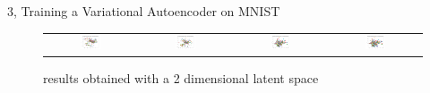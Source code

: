 \documentclass[10pt,a4paper]{article}
\begin{document}
\begin{task}{3, Training a Variational Autoencoder on MNIST}
\begin{enumerate}
\begin{figure}[H]
\caption{results obtained with a 2 dimensional latent space}
\label{fig:latent-2} 
\begin{tabular}{cccc}
  \includegraphics[width=0.23\textwidth]{../plots/task3/latent_epoch1_latent2.png} &   \includegraphics[width=0.23\textwidth]{../plots/task3/latent_epoch5_latent2.png} & \includegraphics[width=0.23\textwidth]{../plots/task3/latent_epoch25_latent2.png} &   \includegraphics[width=0.23\textwidth]{../plots/task3/latent_epoch50_latent2.png} \\

\end{tabular}
\end{figure}
\end{enumerate}
\end{task}
\end{document}
